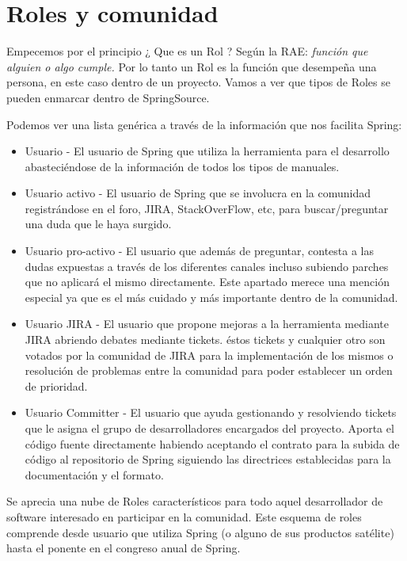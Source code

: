 \documentclass[11pt]{scrartcl}
\begin{document}
\section{Roles y comunidad}

Empecemos por el principio ¿ Que es un Rol ? Según la RAE: \emph{funci\'on que alguien o algo cumple.}
Por lo tanto un Rol es la función que desempeña una persona, en este caso dentro de un proyecto.
Vamos a ver que tipos de Roles se pueden enmarcar dentro de SpringSource.

Podemos ver una lista genérica a través de la información que nos facilita Spring:

\begin{itemize}
    \item Usuario - El usuario de Spring que utiliza la herramienta para el desarrollo abasteciéndose de la información de todos los tipos de manuales.
    \item Usuario activo - El usuario de Spring que se involucra en la comunidad registrándose en el foro, JIRA, StackOverFlow, etc, para buscar/preguntar una duda que le haya surgido.
    \item Usuario pro-activo - El usuario que además de preguntar, contesta a las dudas expuestas a través de los diferentes canales incluso subiendo parches que no aplicará el mismo directamente. Este apartado merece una mención especial ya que es el más cuidado y más importante dentro de la comunidad.
    \item Usuario JIRA - El usuario que propone mejoras a la herramienta mediante JIRA abriendo debates mediante tickets. éstos tickets y cualquier otro son votados por la comunidad de JIRA para la implementación de los mismos o resolución de problemas entre la comunidad para poder establecer un orden de prioridad.
    \item Usuario Committer - El usuario que ayuda gestionando y resolviendo tickets que le asigna el grupo de desarrolladores encargados del proyecto. Aporta el código fuente directamente habiendo aceptando el contrato para la subida de código al repositorio de Spring siguiendo las directrices establecidas para la documentación y el formato.
\end{itemize}

Se aprecia una nube de Roles característicos para todo aquel desarrollador de software interesado en participar en la comunidad. Este esquema de roles comprende desde usuario que utiliza Spring (o alguno de sus productos satélite) hasta el ponente en el congreso anual de Spring.
\end{document}
